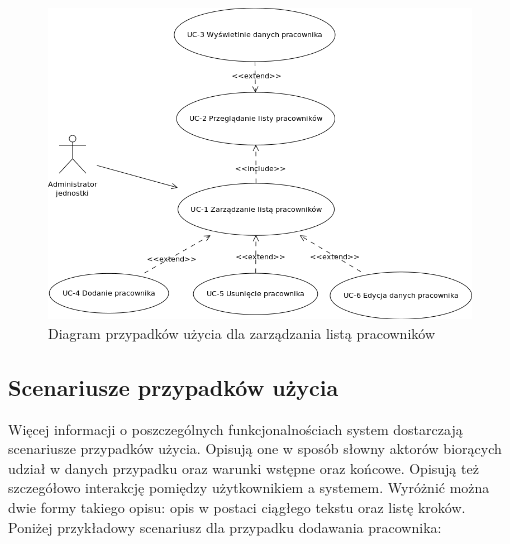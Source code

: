 \begin{figure}[tdh]
    \begin{center}
	\includegraphics[scale=.6]{img/diagram-uc.png}
	\caption{Diagram przypadków użycia dla zarządzania listą pracowników}
	\label{diagram-uc}
    \end{center}
\end{figure}


\subsection[Scenariusze przypadków użycia][Scenariusze przypadków użycia]{Scenariusze przypadków użycia}
Więcej informacji o poszczególnych funkcjonalnościach system dostarczają scenariusze przypadków użycia. Opisują one w sposób słowny aktorów biorących udział w danych przypadku oraz warunki wstępne oraz końcowe. Opisują też szczegółowo interakcję pomiędzy użytkownikiem a systemem. Wyróżnić można dwie formy takiego opisu: opis w postaci ciągłego tekstu oraz listę kroków. Poniżej przykładowy scenariusz dla przypadku dodawania pracownika:

